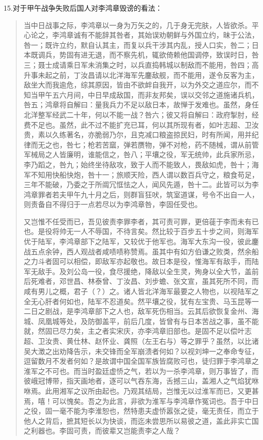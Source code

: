 15.对于甲午战争失败后国人对李鸿章毁谤的看法：
\begin{quotation}
当中日战事之际，李鸿章以一身为万矢之的，几于身无完肤，人皆欲杀。平心论之，李鸿章诚有不能辞其咎者，其始误劝朝鲜与外国立约，昧于公法，咎一；既许立约，默自认其主，而复以兵干涉其内乱，授人口实，咎二；日本既调兵，势固有进无退，而不察先机，辄欲倚赖他国调停，致误时日，咎三；聂士成请乘日军未消集之时，以兵直捣韩城以制敌而不能用，咎四；高升事未起之前，丁汝昌请以北洋海军先鏖敌舰，而不能用，遂令反客为主，敌坐大而我逾危，综其原因，皆由不欲衅自我开，以为外交之道应尔，而不知当甲午五六月间，中日早成敌国，而非友邦矣，误以交邻之道施诸兵机，咎五；鸿章将自解曰：量我兵力不足以敌日本，故惮于发难也。虽然，身任北洋整军经武二十年，何以不能一战？咎六；彼又将自解曰：政府掣肘，经费不足也。虽然，此不过不能扩充已耳，何以其所现有者，如叶志超、卫汝贵，素以久练著名，亦脆弱乃尔，且克减口粮盗掠民妇，时有所闻，用并纪律而无之也，咎七；枪若苦窳，弹若赝物，弹不对枪，药不随械，谓从前管军械局之人皆廉明，谁能信之，咎八；平壤之役，军无统帅，此兵家所忌，李乃蹈之，咎九；始终坐待敌攻，致于人而不能致人，畏敌如虎，咎十；海军不知用快船快炮，咎十一；旅顺天险，西人谓以数百兵守之，粮食苟足，三年不能破，乃委之于所阘冗恇怯之人，闻风先遁，咎十二。此皆可以为李鸿章罪者若夫甲午九十月之后，则群盲狂吠，筑室道谋，号令不出自一人，则责备自不得归于一点若尽以为李鸿章咎，李固任受也。

又岂惟不任受而已，吾见彼责李罪李者，其可责可罪，更倍蓰于李而未有已也。是役将帅无一人不辱国，不待言矣。然比较于百步五十步之间，则海军优于陆军，李鸿章部下之陆军，又较优于他军也。海军大东沟一役，彼此鏖战五点余钟，西人观战者咸啧啧称赞焉。虽其中有如方伯谦之败类，然余船之力斗者固可以相偿，即敌军亦起敬也。故日本是役，惟海军有敌手，而陆军无敌手。及刘公岛一役，食尽援绝，降敌以全生灵，殉身以全大节，盖前后死难者，邓世昌、林泰曾、丁汝昌、刘步蟾、张文宣，虽其死所不同，而咸有男儿之概，君子（？）之。诸人皆北洋海军最要之人物也，以视陆军之全无心肝者何如也，陆军不忍道矣。然平壤之役，犹有左宝贵、马玉昆等一二日之剧战，是李鸿章部下之人也，敌军死伤相当。云其后欲恢复金州、海城、凤凰城等处，及防御盖平，前后几度，皆曾有与日本苦战之事，虽不能就，然固已尽力矣，主之者实宋庆，亦李鸿章旧部也。是固不足以偿叶志超、卫汝贵、黄仕林、赵怀业、龚照（左王右与）等之罪乎？虽然，以比诸吴大澂之出劝降告示，未交锋而全军崩溃者何如？以视刘坤一之奉命专征，逗留数月不发者何如？是故谓中国全国军族皆腐败可也，徒归罪于李鸿章之淮军之不可也。而当时盈廷虚㤭之气，若以为一杀李鸿章，则万事皆了，而彼峨冠博带，指天画地者，逐可以气吞东海，舌撼三山，盖湘人之气焰犹咻咻焉。此用湘军之议所由起也。乃观其结局，岂惟无以过淮军而已，又更甚焉，嘻！可以愧矣。吾之为此言，非欲为淮军与李鸿章作冤词也。吾于中日之役，固一毫不能为李淮恕也，然特患夫虚㤭嚣张之徒，毫无责任，而立于他人之背后，摭其短长以为快谈，而迄未尝思所以易彼之道，盖此非实亡国之利器也。李固可责，而彼辈又岂能责李之人哉？


\end{quotation}
